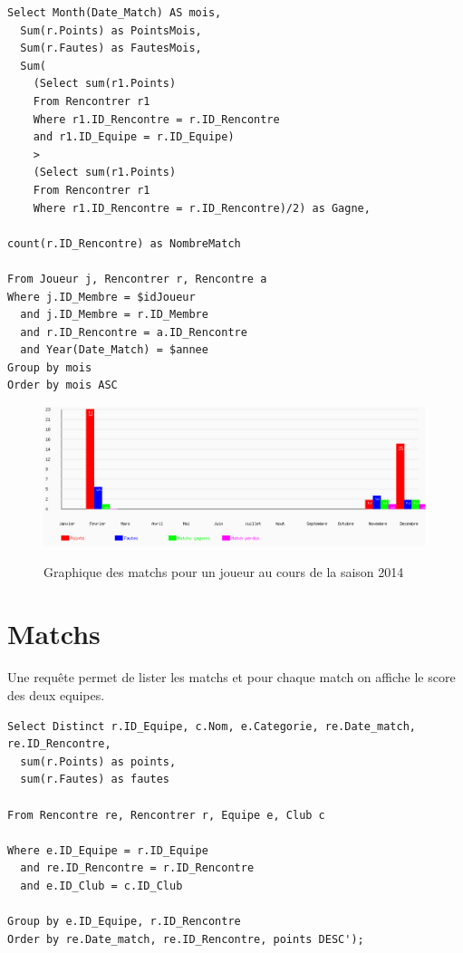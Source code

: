 \documentclass[a4paper»,8pt,french,fleqn]{report}
\begin{document}
\begin{lstlisting}
Select Month(Date_Match) AS mois,
  Sum(r.Points) as PointsMois,
  Sum(r.Fautes) as FautesMois,
  Sum(
    (Select sum(r1.Points)
    From Rencontrer r1
    Where r1.ID_Rencontre = r.ID_Rencontre
    and r1.ID_Equipe = r.ID_Equipe)
    >
    (Select sum(r1.Points)
    From Rencontrer r1
    Where r1.ID_Rencontre = r.ID_Rencontre)/2) as Gagne,
    
count(r.ID_Rencontre) as NombreMatch

From Joueur j, Rencontrer r, Rencontre a
Where j.ID_Membre = $idJoueur
  and j.ID_Membre = r.ID_Membre
  and r.ID_Rencontre = a.ID_Rencontre
  and Year(Date_Match) = $annee
Group by mois 
Order by mois ASC
\end{lstlisting}

\begin{figure}[h]
  \centering
    \includegraphics[scale=0.5]{graphe.png}
    \label{fig:graph}
    \caption{Graphique des matchs pour un joueur au cours de la saison 2014}
\end{figure}


\section{Matchs}
Une requête permet de lister les matchs et pour chaque match on affiche le score des deux equipes.

\begin{lstlisting}
Select Distinct r.ID_Equipe, c.Nom, e.Categorie, re.Date_match, re.ID_Rencontre,
  sum(r.Points) as points, 
  sum(r.Fautes) as fautes 

From Rencontre re, Rencontrer r, Equipe e, Club c

Where e.ID_Equipe = r.ID_Equipe
  and re.ID_Rencontre = r.ID_Rencontre
  and e.ID_Club = c.ID_Club

Group by e.ID_Equipe, r.ID_Rencontre
Order by re.Date_match, re.ID_Rencontre, points DESC');
\end{lstlisting}
\end{document}
